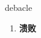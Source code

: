 
\begin{frame}
{\huge debacle}
\begin{center}
\begin{enumerate}\Large
  \item \textbf{溃败}
\end{enumerate}
\end{center}
\end{frame}
